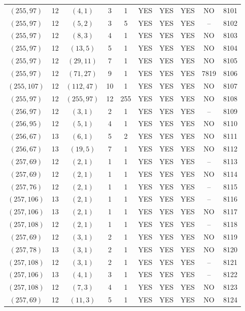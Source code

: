 \begin{longtable}{|c|c|c|c|c|c|c|c|c|c|}
$(255, 97)$ & 12 & $(4, 1)$ & 3 & 1 & YES & YES & YES & NO & 8101\\
$(255, 97)$ & 12 & $(5, 2)$ & 3 & 5 & YES & YES & YES & -- & 8102\\
$(255, 97)$ & 12 & $(8, 3)$ & 4 & 1 & YES & YES & YES & NO & 8103\\
$(255, 97)$ & 12 & $(13, 5)$ & 5 & 1 & YES & YES & YES & NO & 8104\\
$(255, 97)$ & 12 & $(29, 11)$ & 7 & 1 & YES & YES & YES & NO & 8105\\
$(255, 97)$ & 12 & $(71, 27)$ & 9 & 1 & YES & YES & YES & 7819 & 8106\\
$(255, 107)$ & 12 & $(112, 47)$ & 10 & 1 & YES & YES & YES & NO & 8107\\
$(255, 97)$ & 12 & $(255, 97)$ & 12 & 255 & YES & YES & YES & NO & 8108\\
$(256, 97)$ & 12 & $(3, 1)$ & 2 & 1 & YES & YES & YES & -- & 8109\\
$(256, 95)$ & 12 & $(5, 1)$ & 4 & 1 & YES & YES & YES & NO & 8110\\
$(256, 67)$ & 13 & $(6, 1)$ & 5 & 2 & YES & YES & YES & NO & 8111\\
$(256, 67)$ & 13 & $(19, 5)$ & 7 & 1 & YES & YES & YES & NO & 8112\\
$(257, 69)$ & 12 & $(2, 1)$ & 1 & 1 & YES & YES & YES & -- & 8113\\
$(257, 69)$ & 12 & $(2, 1)$ & 1 & 1 & YES & YES & YES & NO & 8114\\
$(257, 76)$ & 12 & $(2, 1)$ & 1 & 1 & YES & YES & YES & -- & 8115\\
$(257, 106)$ & 13 & $(2, 1)$ & 1 & 1 & YES & YES & YES & -- & 8116\\
$(257, 106)$ & 13 & $(2, 1)$ & 1 & 1 & YES & YES & YES & NO & 8117\\
$(257, 108)$ & 12 & $(2, 1)$ & 1 & 1 & YES & YES & YES & -- & 8118\\
$(257, 69)$ & 12 & $(3, 1)$ & 2 & 1 & YES & YES & YES & NO & 8119\\
$(257, 78)$ & 13 & $(3, 1)$ & 2 & 1 & YES & YES & YES & NO & 8120\\
$(257, 108)$ & 12 & $(3, 1)$ & 2 & 1 & YES & YES & YES & -- & 8121\\
$(257, 106)$ & 13 & $(4, 1)$ & 3 & 1 & YES & YES & YES & -- & 8122\\
$(257, 108)$ & 12 & $(7, 3)$ & 4 & 1 & YES & YES & YES & NO & 8123\\
$(257, 69)$ & 12 & $(11, 3)$ & 5 & 1 & YES & YES & YES & NO & 8124\\

\end{longtable}

